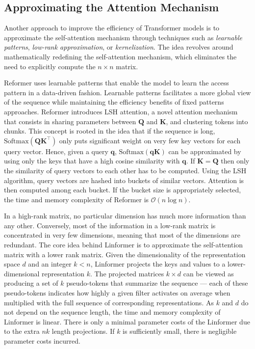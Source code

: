 \subsection{Approximating the Attention Mechanism}

Another approach to improve the efficiency of Transformer models is to approximate the self-attention mechanism through techniques such as \textit{learnable patterns}, \textit{low-rank approximation}, or \textit{kernelization}. The idea revolves around mathematically redefining the self-attention mechanism, which eliminates the need to explicitly compute the $n \times n$ matrix.

Reformer \citep{kitaev2020reformer} uses learnable patterns that enable the model to learn the access pattern in a data-driven fashion. Learnable patterns facilitates a more global view of the sequence while maintaining the efficiency benefits of fixed patterns approaches. Reformer introduces \ac{LSH} attention, a novel attention mechanism that consists in sharing parameters between $\bm{Q}$ and $\bm{K}$, and clustering tokens into chunks. This concept is rooted in the idea that if the sequence is long, $\text{Softmax}(\bm{Q}\bm{K}^{\top})$ only puts significant weight on very few key vectors for each query vector. Hence, given a query $\bm{q}$, $\text{Softmax}(\bm{qK})$ can be approximated by using only the keys that have a high cosine similarity with $\bm{q}$. If $\bm{K} = \bm{Q}$ then only the similarity of query vectors to each other has to be computed. Using the \ac{LSH} algorithm, query vectors are hashed into buckets of similar vectors. Attention is then computed among each bucket. If the bucket size is appropriately selected, the time and memory complexity of Reformer is $\mathcal{O}(n \log n)$. 

In a high-rank matrix, no particular dimension has much more information than any other. Conversely, most of the information in a low-rank matrix is concentrated in very few dimensions, meaning that most of the dimensions are redundant. The core idea behind Linformer \citep{wang2020linformer} is to approximate the self-attention matrix with a lower rank matrix. Given the dimensionality of the representation space $d$ and an integer $k < n$, Linformer projects the keys and values to a lower-dimensional representation $k$. The projected matrices $k \times d$ can be viewed as producing a set of $k$ pseudo-tokens that summarize the sequence — each of these pseudo-tokens indicates how highly a given filter activates on average when multiplied with the full sequence of corresponding representations. As $k$ and $d$ do not depend on the sequence length, the time and memory complexity of Linformer is linear. There is only a minimal parameter costs of the Linformer due to the extra $nk$ length projections. If $k$ is sufficiently small, there is negligible parameter costs incurred. 

